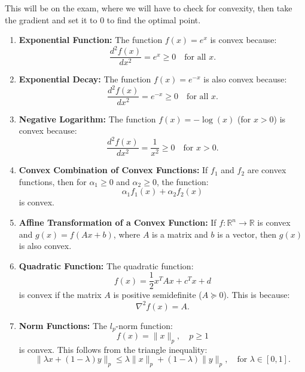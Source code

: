 \begin{warning}
    This will be on the exam, where we will have to check for convexity, then take the gradient and set it to 0 to find the optimal point.
\end{warning}

\begin{example}
    \begin{enumerate}
        \item \textbf{Exponential Function:} The function $f(x) = e^x$ is convex because:
        \[
        \frac{d^2 f(x)}{dx^2} = e^x \geq 0 \quad \text{for all } x.
        \]
    
        \item \textbf{Exponential Decay:} The function $f(x) = e^{-x}$ is also convex because:
        \[
        \frac{d^2 f(x)}{dx^2} = e^{-x} \geq 0 \quad \text{for all } x.
        \]

        \item \textbf{Negative Logarithm:} The function $f(x) = -\log(x)$ (for $x > 0$) is convex because:
        \[
        \frac{d^2 f(x)}{dx^2} = \frac{1}{x^2} \geq 0 \quad \text{for } x > 0.
        \]
    
        \item \textbf{Convex Combination of Convex Functions:} If $f_1$ and $f_2$ are convex functions, then for $\alpha_1 \geq 0$ and $\alpha_2 \geq 0$, the function:
        \[
        \alpha_1 f_1(x) + \alpha_2 f_2(x)
        \]
        is convex.
    
        \item \textbf{Affine Transformation of a Convex Function:} If $f: \mathbb{R}^n \to \mathbb{R}$ is convex and $g(x) = f(Ax + b)$, where $A$ is a matrix and $b$ is a vector, then $g(x)$ is also convex.
    
        \item \textbf{Quadratic Function:} The quadratic function:
        \[
        f(x) = \frac{1}{2}x^T A x + c^T x + d
        \]
        is convex if the matrix $A$ is positive semidefinite ($A \succeq 0$). This is because:
        \[
        \nabla^2 f(x) = A.
        \]
    
        \item \textbf{Norm Functions:} The $l_p$-norm function:
        \[
        f(x) = \|x\|_p, \quad p \geq 1
        \]
        is convex. This follows from the triangle inequality:
        \[
        \|\lambda x + (1 - \lambda)y\|_p \leq \lambda \|x\|_p + (1 - \lambda)\|y\|_p, \quad \text{for } \lambda \in [0, 1].
        \]
    \end{enumerate}    
\end{example}

